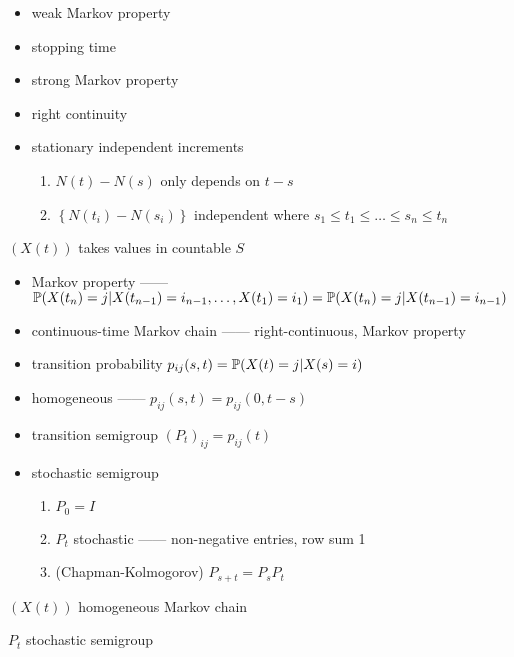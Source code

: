 \begin{itemize}
    \item weak Markov property
    \item stopping time
    \item strong Markov property
    \item right continuity
    \item stationary independent increments
    \begin{enumerate}
        \item $N(t) - N(s)$ only depends on $t - s$
        \item $\left\{ N(t_i) - N(s_i) \right\}$ independent where $s_1 \leq t_1 \leq \dots \leq s_n \leq t_n$
    \end{enumerate}
\end{itemize}

\begin{setting}
    $(X(t))$ takes values in countable $S$
\end{setting}

\begin{itemize}
    \item Markov property ------ \\$\mathbb{P}(X(t_n) = j|X(t_{n-1}) = i_{n-1}, \dots, X(t_1) = i_1) =\mathbb{P}(X(t_n) = j|X(t_{n-1}) = i_{n-1}) $
    \item continuous-time Markov chain ------ right-continuous, Markov property
    \item transition probability $p_{ij}(s, t) = \mathbb{P}(X(t) = j|X(s) = i)$
    \item homogeneous ------ $p_{ij}(s, t) = p_{ij}(0, t-s)$
    \item transition semigroup $(P_t)_{ij} = p_{ij}(t)$
    \item stochastic semigroup
    \begin{enumerate}
        \item $P_0 = I$
        \item $P_t$ stochastic ------ non-negative entries, row sum 1
        \item (Chapman-Kolmogorov) $P_{s+t} = P_s P_t$
    \end{enumerate}
\end{itemize}

\begin{setting}
    $(X(t))$ homogeneous Markov chain
\end{setting}

\begin{thm}
    $P_t$ stochastic semigroup
\end{thm}

